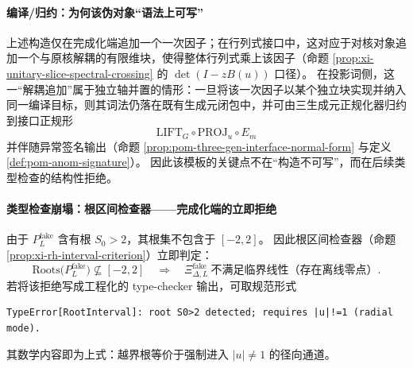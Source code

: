 \paragraph{编译/归约：为何该伪对象“语法上可写”}
上述构造仅在完成化端追加一个一次因子；在行列式接口中，这对应于对核对象追加一个与原核解耦的有限维块，使得整体行列式乘上该因子（命题 \ref{prop:xi-unitary-slice-spectral-crossing} 的 \(\det(I-zB(u))\) 口径）。
在投影词侧，这一“解耦追加”属于独立轴并置的情形：一旦将该一次因子以某个独立块实现并纳入同一编译目标，则其词法仍落在既有生成元闭包中，并可由三生成元正规化器归约到接口正规形
\[
\mathrm{LIFT}_G\circ \mathrm{PROJ}_u\circ E_m
\]
并伴随异常签名输出（命题 \ref{prop:pom-three-gen-interface-normal-form} 与定义 \ref{def:pom-anom-signature}）。
因此该模板的关键点不在“构造不可写”，而在后续类型检查的结构性拒绝。

\paragraph{类型检查崩塌：根区间检查器——完成化端的立即拒绝}
由于 \(P^{\mathrm{fake}}_L\) 含有根 \(S_0>2\)，其根集不包含于 \([-2,2]\)。
因此根区间检查器（命题 \ref{prop:xi-rh-interval-criterion}）立即判定：
\[
\mathrm{Roots}\bigl(P^{\mathrm{fake}}_L\bigr)\not\subseteq [-2,2]
\quad\Longrightarrow\quad
\Xi^{\mathrm{fake}}_{\Delta,L}\ \text{不满足临界线性（存在离线零点）}.
\]
若将该拒绝写成工程化的 type-checker 输出，可取规范形式
\begin{verbatim}
TypeError[RootInterval]: root S0>2 detected; requires |u|!=1 (radial mode).
\end{verbatim}
其数学内容即为上式：越界根等价于强制进入 \(|u|\neq 1\) 的径向通道。

